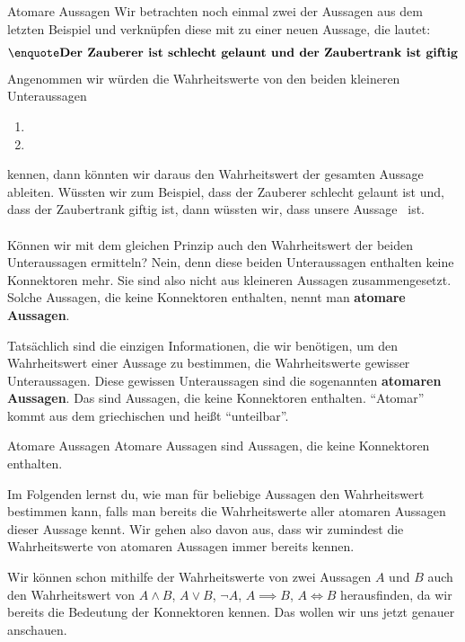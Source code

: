 \documentclass[../../main.tex]{subfiles}
\begin{document}
\begin{example}{Atomare Aussagen}
Wir betrachten noch einmal zwei der Aussagen aus dem letzten Beispiel und verknüpfen diese mit  zu einer neuen Aussage, die lautet:
\[\statement{Der Zauberer ist schlecht gelaunt und der Zaubertrank ist giftig}\]
Angenommen wir würden die Wahrheitswerte von den beiden kleineren Unteraussagen
\begin{enumerate}
    \item {}
    \item {}
\end{enumerate}
kennen, dann könnten wir daraus den Wahrheitswert der gesamten Aussage ableiten. Wüssten wir zum Beispiel, dass der Zauberer schlecht gelaunt ist und, dass der Zaubertrank giftig ist, dann wüssten wir, dass unsere Aussage  \wahr\  ist.
\\ \\
Können wir mit dem gleichen Prinzip auch den Wahrheitswert der beiden Unteraussagen ermitteln? Nein, denn diese beiden Unteraussagen enthalten keine Konnektoren mehr. Sie sind also nicht aus kleineren Aussagen zusammengesetzt. Solche Aussagen, die keine Konnektoren enthalten, nennt man \textbf{atomare Aussagen}.
\end{example}

Tatsächlich sind die einzigen Informationen, die wir benötigen, 
um den Wahrheitswert einer Aussage zu bestimmen, die Wahrheitswerte 
gewisser Unteraussagen. Diese gewissen Unteraussagen sind die sogenannten 
\textbf{atomaren Aussagen}. Das sind Aussagen, die keine Konnektoren enthalten. 
\enquote{Atomar} kommt aus dem griechischen und heißt \enquote{unteilbar}.

\begin{definition} {Atomare Aussagen}
Atomare Aussagen sind Aussagen, die keine Konnektoren enthalten.
\end{definition}

Im Folgenden lernst du, wie man für beliebige Aussagen den Wahrheitswert 
bestimmen kann, falls man bereits die Wahrheitswerte aller atomaren Aussagen 
dieser Aussage kennt. Wir gehen also davon aus, dass wir zumindest die 
Wahrheitswerte von atomaren Aussagen immer bereits kennen.

Wir können schon mithilfe der Wahrheitswerte von zwei Aussagen $A$ und $B$ 
auch den 
Wahrheitswert von $A \land B$, $A \lor B$, $\lnot A$, $A \implies B$, $A \iff B$
herausfinden, da wir bereits die Bedeutung der Konnektoren kennen. Das wollen
wir uns jetzt genauer anschauen.
\end{document}
